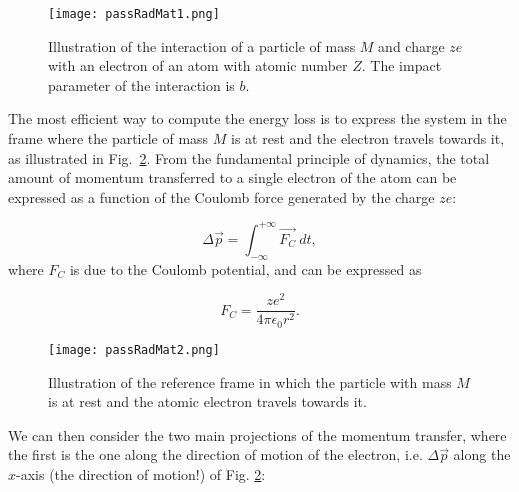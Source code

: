 \begin{figure}
  \centering \texttt{[image: passRadMat1.png]}
  \caption{Illustration of the interaction of a particle of mass $M$ and charge $ze$ with an electron of an atom with atomic number $Z$. The impact parameter of the interaction is $b$.}
  \label{fig:passRadMat1}
\end{figure}

The most efficient way to compute the energy loss is to express the system in the frame where the particle of mass $M$ is at rest and the electron travels towards it, as illustrated in Fig.~\ref{fig:passRadMat2}. From the fundamental principle of dynamics, the total amount of momentum transferred to a 
single electron of the atom can be expressed as a function of the Coulomb force generated by the charge $ze$:

\[ \Delta \vec{p} = \int_{-\infty}^{+\infty}\vec{F_C}\ dt,\] where $F_C$ is due to the Coulomb potential, and can be expressed as

\[F_C =\frac{ze^2}{4\pi\epsilon_0r^2}.\]

\begin{figure}
  \centering \texttt{[image: passRadMat2.png]}
  \caption{Illustration of the reference frame in which the particle with mass $M$ is at rest and the atomic electron travels towards it.}
  \label{fig:passRadMat2}
\end{figure}

We can then consider the two main projections of the momentum transfer, where the first is the one along the direction of motion of the electron, i.e. $\Delta\vec{p}$ along the $x$-axis (the direction of motion!) of Fig. \ref{fig:passRadMat2}:

